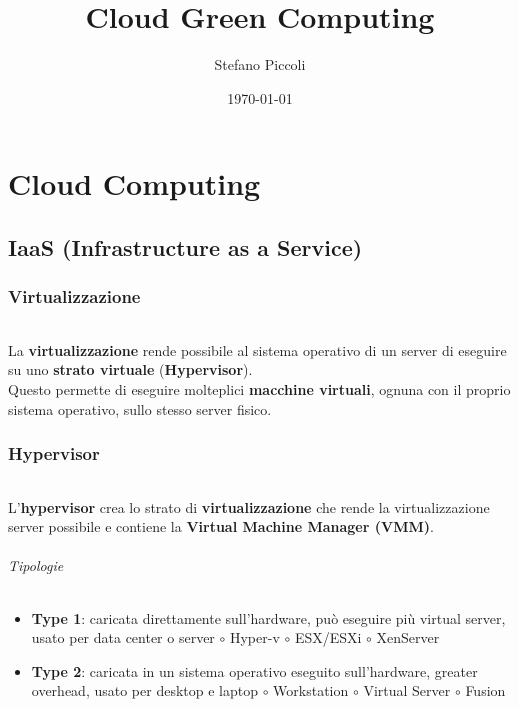 \documentclass[a4paper, 12pt]{report}
\begin{document}
\title{
\textbf{Cloud Green Computing}}
\author{Stefano Piccoli}
\date{\today}
\maketitle
\tableofcontents
\part{Cloud Computing}
    \chapter{IaaS (Infrastructure as a Service)}
      \section{Virtualizzazione}
        \paragraph{}La \textbf{virtualizzazione} rende possibile al sistema operativo di un server di eseguire su uno \textbf{strato virtuale} (\textbf{Hypervisor}).\\
        Questo permette di eseguire molteplici \textbf{macchine virtuali}, ognuna con il proprio sistema operativo, sullo stesso server fisico.
      \section{Hypervisor}
        \paragraph{}L'\textbf{hypervisor} crea lo strato di \textbf{virtualizzazione} che rende la virtualizzazione server possibile e contiene la \textbf{Virtual Machine Manager (VMM)}.
        \paragraph{Tipologie}
        \begin{itemize}
          \item \textbf{Type 1}: caricata direttamente sull'hardware, può eseguire più virtual server, usato per data center o server
            \subitem $\circ$ Hyper-v 
            \subitem $\circ$ ESX/ESXi 
            \subitem $\circ$ XenServer
          \item \textbf{Type 2}: caricata in un sistema operativo eseguito sull'hardware, greater overhead, usato per desktop e laptop
            \subitem $\circ$ Workstation 
            \subitem $\circ$ Virtual Server
            \subitem $\circ$ Fusion
        \end{itemize}
\end{document}
